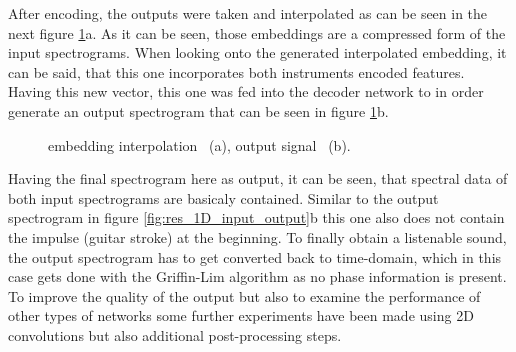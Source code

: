 After encoding, the outputs were taken and interpolated as can be seen in the next figure \ref{fig:res_1D_interpolation}a. As it can be seen, those embeddings are a compressed form of the input spectrograms. When looking onto the generated interpolated embedding, it can be said, that this one incorporates both instruments encoded features. Having this new vector, this one was fed into the decoder network to in order generate an output spectrogram that can be seen in figure \ref{fig:res_1D_interpolation}b. 

\begin{figure}[htb!]
    \centering
    \caption{embedding interpolation ~(a), output signal ~(b).}
    \label{fig:res_1D_interpolation}
\end{figure}

Having the final spectrogram here as output, it can be seen, that spectral data of both input spectrograms are basicaly contained. Similar to the output spectrogram in figure \ref{fig:res_1D_input_output}b this one also does not contain the impulse (guitar stroke) at the beginning. To finally obtain a listenable sound, the output spectrogram has to get converted back to time-domain, which in this case gets done with the Griffin-Lim algorithm \cite{Griffin1984} as no phase information is present. To improve the quality of the output but also to examine the performance of other types of networks some further experiments have been made using 2D convolutions but also additional post-processing steps.


